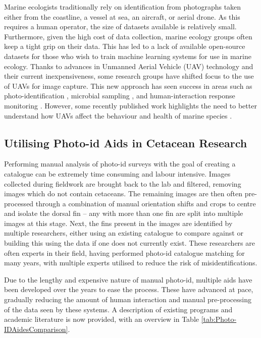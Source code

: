 Marine ecologists traditionally rely on identification from photographs taken either from the coastline, a vessel at sea, an aircraft, or aerial drone. As this requires a human operator, the size of datasets available is relatively small. Furthermore, given the high cost of data collection, marine ecology groups often keep a tight grip on their data. This has led to a lack of available open-source datasets for those who wish to train machine learning systems for use in marine ecology. Thanks to advances in Unmanned Aerial Vehicle (UAV) technology and their current inexpensiveness, some research groups have shifted focus to the use of UAVs for image capture. This new approach has seen success in areas such as photo-identification \cite{bogucki_applying_2019, gray_drones_2019}, microbial sampling \cite{centelleghe_use_2020}, and human-interaction response monitoring \cite{fiori_using_2020}. However, some recently published work highlights the need to better understand how UAVs affect the behaviour and health of marine species \cite{giles_responses_2020, bevan_measuring_2018, ramos_bottlenose_2018, pomeroy_assessing_2015}. 

\subsection{Utilising Photo-id Aids in Cetacean Research}\label{ch:Background,sec:conTech,sub:photoIDAides}

Performing manual analysis of photo-id surveys with the goal of creating a catalogue can be extremely time consuming and labour intensive. Images collected during fieldwork are brought back to the lab and filtered, removing images which do not contain cetaceans. The remaining images are then often pre-processed through a combination of manual orientation shifts and crops to centre and isolate the dorsal fin -- any with more than one fin are split into multiple images at this stage. Next, the fins present in the images are identified by multiple researchers, either using an existing catalogue to compare against or building this using the data if one does not currently exist. These researchers are often experts in their field, having performed photo-id catalogue matching for many years, with multiple experts utilised to reduce the risk of misidentifications. 

Due to the lengthy and expensive nature of manual photo-id, multiple aids have been developed over the years to ease the process. These have advanced at pace, gradually reducing the amount of human interaction and manual pre-processing of the data seen by these systems. A description of existing programs and academic literature is now provided, with an overview in Table \ref{tab:Photo-IDAidesComparison}.

